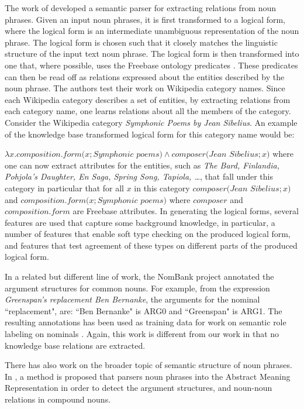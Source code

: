 The work of \cite{choi2015scalable} developed a semantic parser for extracting relations
 from noun phrases. Given an input noun phrases, it is first transformed to a logical form, where the logical form is an 
 intermediate unambiguous representation of the noun phrase.
The  logical form is chosen such that it  closely matches the linguistic structure
of the input text noun phrase. The logical form is then transformed into one that, where possible,
uses the Freebase ontology predicates \cite{Bollacker2008}. These predicates can then be read off as relations expressed about the 
entities described by the noun phrase. The authors test their work on Wikipedia category names. Since each Wikipedia category
describes a set of entities, by extracting relations from each category name, one learns relations about all the members of the category.
Consider the Wikipedia category \textit{Symphonic Poems by Jean Sibelius}.  An example of the knowledge base transformed  logical form for this category name would be: 

$\lambda x.composition.form(x;Symphonic$ $poems) \wedge composer(Jean$ $Sibelius; x)$ where one can now extract attributes for the entities, such as \textit{The Bard, Finlandia, Pohjola’s Daughter, En Saga, Spring Song, Tapiola, \ldots},  that 
fall under this category  in particular that for all $x$ in this category $composer(Jean$ $Sibelius; x)$ and  $composition.form(x; Symphonic$ $poems)$
where $composer$ and $composition.form$ are Freebase attributes. In generating the logical forms, several features are used that capture some background knowledge, in particular,   a number of features that enable soft
 type checking on the  produced logical form, and  features that test agreement of these
 types on different parts of the produced  logical form.
 
In a related but different line of work,  the NomBank project  \cite{conf/lrec/MeyersRMSZYG04,conf/acl/GerberC10} annotated the argument
structures for common nouns. For example, from the expression \textit{Greenspan’s replacement Ben Bernanke},
the arguments for the nominal ``replacement", are: ``Ben
Bernanke" is  ARG0 and ``Greenspan" is  ARG1. The resulting annotations
has been used as training data for work on semantic role labeling on nominals \cite{jiang2006semantic,conf/acl/LiuN07}.
Again, this work is different from our work in that no knowledge base relations are extracted.


There has  also  work on the broader topic of semantic structure of noun phrases. In \cite{conf/acl/SawaiSM15}, a method is proposed that parsers noun phrases into the Abstract Meaning Representation in order to detect the argument structures, and noun-noun relations in compound nouns.



